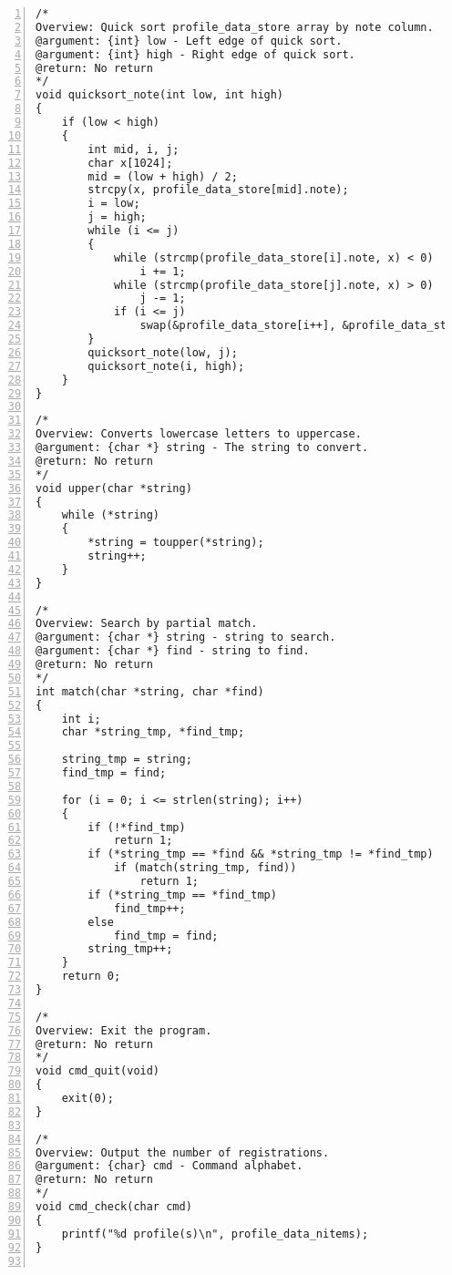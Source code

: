\documentclass[autodetect-engine,dvi=dvipdfmx,ja=standard,
               a4j,11pt]{bxjsarticle}
\begin{document}
\begin{Verbatim}[numbers=left, xleftmargin=10mm, numbersep=6pt,
    fontsize=\small, baselinestretch=0.8]
/*
Overview: Quick sort profile_data_store array by note column.
@argument: {int} low - Left edge of quick sort.
@argument: {int} high - Right edge of quick sort.
@return: No return
*/
void quicksort_note(int low, int high)
{
    if (low < high)
    {
        int mid, i, j;
        char x[1024];
        mid = (low + high) / 2;
        strcpy(x, profile_data_store[mid].note);
        i = low;
        j = high;
        while (i <= j)
        {
            while (strcmp(profile_data_store[i].note, x) < 0)
                i += 1;
            while (strcmp(profile_data_store[j].note, x) > 0)
                j -= 1;
            if (i <= j)
                swap(&profile_data_store[i++], &profile_data_store[j--]);
        }
        quicksort_note(low, j);
        quicksort_note(i, high);
    }
}

/*
Overview: Converts lowercase letters to uppercase.
@argument: {char *} string - The string to convert.
@return: No return
*/
void upper(char *string)
{
    while (*string)
    {
        *string = toupper(*string);
        string++;
    }
}

/*
Overview: Search by partial match.
@argument: {char *} string - string to search.
@argument: {char *} find - string to find.
@return: No return
*/
int match(char *string, char *find)
{
    int i;
    char *string_tmp, *find_tmp;

    string_tmp = string;
    find_tmp = find;

    for (i = 0; i <= strlen(string); i++)
    {
        if (!*find_tmp)
            return 1;
        if (*string_tmp == *find && *string_tmp != *find_tmp)
            if (match(string_tmp, find))
                return 1;
        if (*string_tmp == *find_tmp)
            find_tmp++;
        else
            find_tmp = find;
        string_tmp++;
    }
    return 0;
}

/*
Overview: Exit the program.
@return: No return
*/
void cmd_quit(void)
{
    exit(0);
}

/*
Overview: Output the number of registrations.
@argument: {char} cmd - Command alphabet.
@return: No return
*/
void cmd_check(char cmd)
{
    printf("%d profile(s)\n", profile_data_nitems);
}


\end{Verbatim}
\end{document}
